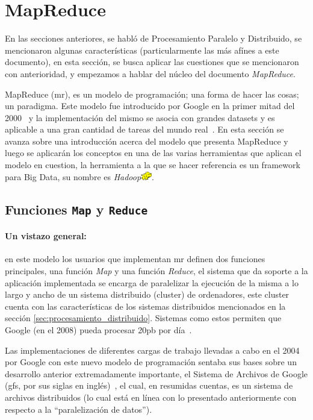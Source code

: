 \section{MapReduce}
\label{ssec:mapreduce}

En las secciones anteriores, se habló de Procesamiento Paralelo y Distribuido,
se mencionaron algunas características (particularmente las más afínes a este
documento), en esta sección, se busca aplicar las cuestiones que se mencionaron
con anterioridad, y empezamos a hablar del núcleo del documento
\textit{MapReduce}.

MapReduce (\acrshort{mr}), es un modelo de programación; una forma de hacer las cosas; un
paradigma. Este modelo fue introducido por Google en la primer mitad del
2000~\cite{dean2004} y la implementación del mismo se asocia con grandes 
\glspl{dataset} y es
aplicable a una gran cantidad de tareas del mundo real~\cite{dean2008}. En esta
sección se avanza sobre una introducción acerca del modelo que presenta
MapReduce y 
luego se aplicarán los conceptos en una de las varias herramientas que aplican
el modelo en cuestion, la herramienta a la que se hacer referencia es un 
\Gls{framework} para Big Data, su nombre es 
\textit{Hadoop}\includegraphics[height=10pt]{figuras/logos/hadoop_logo.png}.

\subsection{Funciones \texttt{Map} y \texttt{Reduce}}

\paragraph{Un vistazo general:}
en este modelo los usuarios que implementan \acrshort{mr} definen dos
funciones principales, una función \textit{Map} y una función \textit{Reduce},
el sistema que da soporte a la aplicación implementada se encarga de
paralelizar la ejecución de la misma a lo largo y ancho de un sistema
distribuido (\gls{cluster}) de ordenadores, este \gls{cluster} cuenta con las
características de los sistemas distribuidos mencionados en la sección
\ref{sec:procesamiento_distribuido}. Sistemas como estos permiten que Google
(en el 2008) pueda procesar 20\acrshort{pb} por día~\cite{dean2008}.

Las implementaciones de diferentes cargas de trabajo llevadas a cabo en el 
2004 por Google con este nuevo modelo de programación sentaba sus bases sobre un
desarrollo anterior extremadamente importante, el Sistema de Archivos de
Google (\acrshort{gfs}, por sus siglas en inglés)~\cite{ghemawat2003}, el cual,
en resumidas cuentas, es un sistema de archivos distribuidos (lo cual está en
línea con lo presentado anteriormente con respecto a la ``paralelización de datos'').



